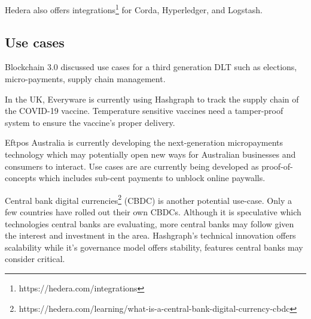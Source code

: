 Hedera also offers integrations\footnote{https://hedera.com/integrations} for Corda, Hyperledger, and Logstash.

\subsection{Use cases}

Blockchain 3.0\cite{maesa2020blockchain} discussed use cases for a third generation DLT such as elections, micro-payments, supply chain management.

In the UK, Everyware is currently using Hashgraph to track the supply chain of the COVID-19 vaccine\cite{ryan2021}. Temperature sensitive vaccines need a tamper-proof system to ensure the vaccine's proper delivery.

Eftpos Australia is currently developing the next-generation micropayments technology which may potentially open new ways for Australian businesses and consumers to interact. Use cases are are currently being developed as proof-of-concepts which includes sub-cent payments to unblock online paywalls\cite{eftpos2021}.

Central bank digital currencies\footnote{https://hedera.com/learning/what-is-a-central-bank-digital-currency-cbdc} (CBDC) is another potential use-case. Only a few countries have rolled out their own CBDCs. Although it is speculative which technologies central banks are evaluating, more central banks may follow given the interest and investment in the area. Hashgraph's technical innovation offers scalability while it's governance model offers stability, features central banks may consider critical.





